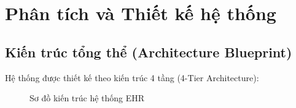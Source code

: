 \documentclass[12pt,a4paper]{report}
\begin{document}
\chapter{Phân tích và Thiết kế hệ thống}\label{chuong-3}

\section{Kiến trúc tổng thể (Architecture Blueprint)}
Hệ thống được thiết kế theo kiến trúc 4 tầng (4-Tier Architecture):

\begin{figure}[H]
    \centering
    \caption{Sơ đồ kiến trúc hệ thống EHR}
\end{figure}
\end{document}
